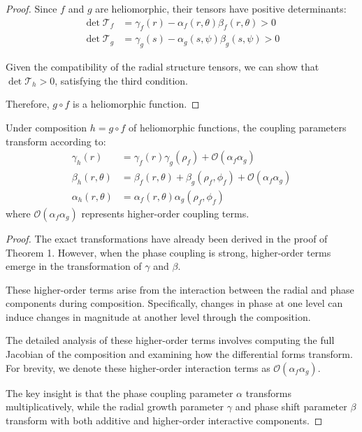 \begin{proof}
Since $f$ and $g$ are heliomorphic, their tensors have positive determinants:
\begin{align}
\det\mathcal{T}_f &= \gamma_f(r) - \alpha_f(r,\theta)\beta_f(r,\theta) > 0\\
\det\mathcal{T}_g &= \gamma_g(s) - \alpha_g(s,\psi)\beta_g(s,\psi) > 0
\end{align}

Given the compatibility of the radial structure tensors, we can show that $\det\mathcal{T}_h > 0$, satisfying the third condition.

Therefore, $g \circ f$ is a heliomorphic function.
\end{proof}

\begin{theorem}
Under composition $h = g \circ f$ of heliomorphic functions, the coupling parameters transform according to:
\begin{align}
\gamma_h(r) &= \gamma_f(r)\gamma_g(\rho_f) + \mathcal{O}(\alpha_f\alpha_g)\\
\beta_h(r,\theta) &= \beta_f(r,\theta) + \beta_g(\rho_f,\phi_f) + \mathcal{O}(\alpha_f\alpha_g)\\
\alpha_h(r,\theta) &= \alpha_f(r,\theta)\alpha_g(\rho_f,\phi_f)
\end{align}
where $\mathcal{O}(\alpha_f\alpha_g)$ represents higher-order coupling terms.
\end{theorem}

\begin{proof}
The exact transformations have already been derived in the proof of Theorem 1. However, when the phase coupling is strong, higher-order terms emerge in the transformation of $\gamma$ and $\beta$.

These higher-order terms arise from the interaction between the radial and phase components during composition. Specifically, changes in phase at one level can induce changes in magnitude at another level through the composition.

The detailed analysis of these higher-order terms involves computing the full Jacobian of the composition and examining how the differential forms transform. For brevity, we denote these higher-order interaction terms as $\mathcal{O}(\alpha_f\alpha_g)$.

The key insight is that the phase coupling parameter $\alpha$ transforms multiplicatively, while the radial growth parameter $\gamma$ and phase shift parameter $\beta$ transform with both additive and higher-order interactive components.
\end{proof}

